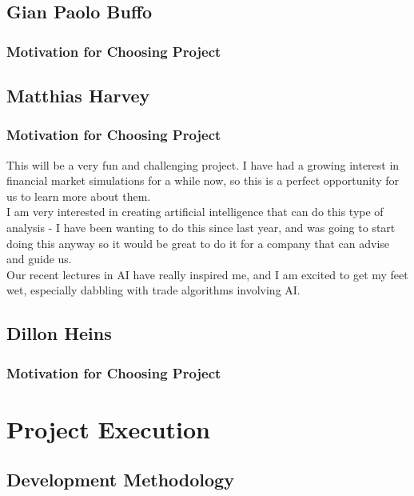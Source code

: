 \documentclass{article}
\begin{document}
	\cleardoublepage		
		
	\subsection{Gian Paolo Buffo}
		
		\subsubsection{Motivation for Choosing Project}

	\cleardoublepage

	\subsection{Matthias Harvey}
		
		\subsubsection{Motivation for Choosing Project}
		This will be a very fun and challenging project. I have had a growing interest in financial market simulations for a while now, so this is a perfect opportunity for us to learn more about them.\\
		
		I am very interested in creating artificial intelligence that can do this type of analysis - I have been wanting to do this since last year, and was going to start doing this anyway so it would be great to do it for a company that can advise and guide us.\\

		Our recent lectures in AI have really inspired me, and I am excited to get my feet wet, especially dabbling with trade algorithms involving AI.
	\cleardoublepage
	
	\subsection{Dillon Heins}
		\subsubsection{Motivation for Choosing Project}

\cleardoublepage
    
\section{Project Execution}
	\subsection{Development Methodology}
	
\end{document}
